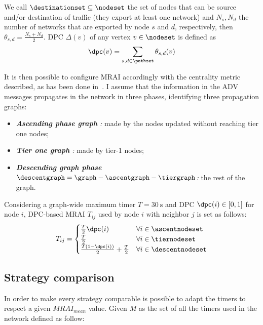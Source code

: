 We call $\destinationset \subseteq \nodeset$ the set of nodes that can be source
and/or destination of traffic (they export at least one network)
and $N_s, N_d$ the number of networks that are exported by node $s$ and $d$,
respectively, then $\theta_{s,d} = \frac{N_s + N_d}{2}$. \ac{DPC} $\Delta(v)$ of
any vertex $v\in \nodeset$ is defined as
\begin{equation}
		\dpc(v) = \sum_{s,d\in \pathset} \theta_{s,d} (v)
		\label{eq:dpcv}
\end{equation}

It is then possible to configure \ac{MRAI} accordingly with the centrality metric
described, as has been done in~\cite{milani2020improving}.
I assume that the information in the \ac{ADV} messages propagates in the network
in three phases, identifying three propagation graphs:
\begin{itemize}
    \item \textit{\textbf{Ascending phase graph \ascentgraph}:} made by the
        nodes updated without reaching tier one nodes;
    \item \textit{\textbf{Tier one graph \tiergraph}:} made by tier-1 nodes;
    \item \textit{\textbf{Descending graph phase $\descentgraph = \graph - \ascentgraph - \tiergraph$}:}
        the rest of the graph.
\end{itemize}

Considering a graph-wide maximum timer $T=\SI{30}{\second}$ and \ac{DPC}
$\dpc(i) \in [0,1]$ for node $i$, DPC-based \ac{MRAI} $T_{ij}$ used by node $i$
with neighbor $j$ is set as follows:
\begin{equation} \label{eq:dpc}
    T_{ij}=
    \begin{cases}
        \frac{T}{2}\dpc(i) & \forall i\in \ascentnodeset  \\
    \frac{T}{2} & \forall i\in \tiernodeset \\
        \frac{T(1-\dpc(i))}{2}+\frac{T}{2} & \forall i\in \descentnodeset\\
    \end{cases}
\end{equation}

\subsection{Strategy comparison}
\label{subsec:bgp_mrai_strategy_comparison}

In order to make every strategy comparable is possible to adapt the timers to
respect a given $MRAI_{mean}$ value.
Given $M$ as the set of all the timers used in the network defined as follow:


